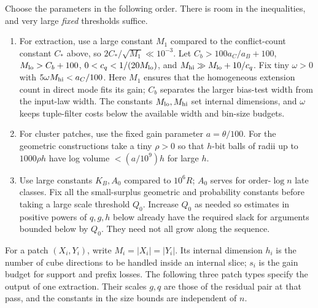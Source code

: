 Choose the parameters in the following order. There is room in the
inequalities, and very large \emph{fixed} thresholds suffice.
\begin{enumerate}
\item For extraction, use a large constant \(M_1\) compared to the conflict-count constant \(C_*\) above, so \(2C_*/\sqrt{M_1}\ll 10^{-3}\). Let \(C_b>100 a_C/a_B+100\), \(M_{\rm lo}>C_b+100\), \(0<c_q<1/(20M_{\rm lo})\), and \(M_{\rm hi}\gg M_{\rm lo}+10/c_q\). Fix tiny \(\omega>0\) with \(5\omega M_{\rm hi}<a_C/100\). Here \(M_1\) ensures that the homogeneous extension count in direct mode fits its gain; \(C_b\) separates the larger bias-test width from the input-law width. The constants \(M_{\rm lo},M_{\rm hi}\) set internal dimensions, and \(\omega\) keeps tuple-filter costs below the available width and bin-size budgets.
\item For cluster patches, use the fixed gain parameter \(a=\theta/100\). For the geometric constructions take a tiny \(\rho>0\) so that \(h\)-bit balls of radii up to \(1000\rho h\) have log volume \(< (a/10^9)h\) for large \(h\).
\item Use large constants \(K_B,A_0\) compared to \(10^6R\); \(A_0\) serves for order-\(\log n\) late classes. Fix all the small-surplus geometric and probability constants before taking a large scale threshold \(Q_0\). Increase \(Q_0\) as needed so estimates in positive powers of \(q,g,h\) below already have the required slack for arguments bounded below by \(Q_0\). They need not all grow along the sequence.
\end{enumerate}

For a patch \((X_i,Y_i)\), write \(M_i=|X_i|=|Y_i|\). Its
internal dimension \(h_i\) is the number of cube directions to be handled
inside an internal slice; \(s_i\) is the gain budget for support and
prefix losses. The following three patch types specify the output of one
extraction. Their scales \(g,q\) are those of the residual pair at that
pass, and the constants in the size bounds are independent of \(n\).

